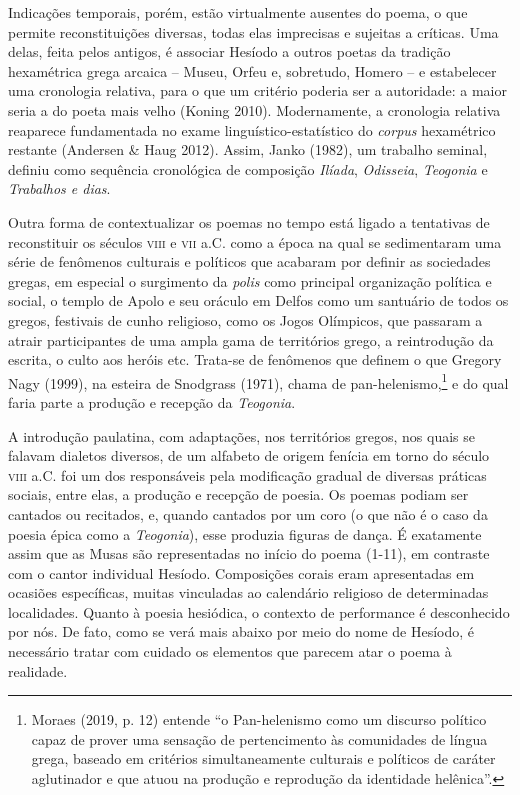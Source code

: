 Indicações temporais, porém, estão virtualmente ausentes do poema, o que
permite reconstituições diversas, todas elas imprecisas e sujeitas a
críticas. Uma delas, feita pelos antigos, é associar Hesíodo a outros
poetas da tradição hexamétrica grega arcaica -- Museu, Orfeu e,
sobretudo, Homero -- e estabelecer uma cronologia relativa, para o que
um critério poderia ser a autoridade: a maior seria a do poeta mais
velho (Koning 2010). Modernamente, a cronologia relativa reaparece
fundamentada no exame linguístico-estatístico do \emph{corpus}
hexamétrico restante (Andersen \& Haug 2012). Assim, Janko (1982), um
trabalho seminal, definiu como sequência cronológica de composição
\emph{Ilíada}, \emph{Odisseia}, \emph{Teogonia} e \emph{Trabalhos e
dias}.

Outra forma de contextualizar os poemas no tempo está ligado a
tentativas de reconstituir os séculos \textsc{viii} e \textsc{vii} a.C. 
como a época na qual se sedimentaram uma série de fenômenos culturais e 
políticos que acabaram por definir as sociedades gregas, em especial o 
surgimento da \emph{polis} como principal organização política e social, 
o templo de Apolo e seu oráculo em Delfos como um santuário de todos os gregos,
festivais de cunho religioso, como os Jogos Olímpicos, que passaram a
atrair participantes de uma ampla gama de territórios grego, a
reintrodução da escrita, o culto aos heróis etc. Trata-se de fenômenos
que definem o que Gregory Nagy (1999), na esteira de Snodgrass (1971),
chama de pan-helenismo,\footnote{Moraes (2019, p. 12) entende ``o
  Pan-helenismo como um discurso político capaz de prover uma sensação
  de pertencimento às comunidades de língua grega, baseado em critérios
  simultaneamente culturais e políticos de caráter aglutinador e que
  atuou na produção e reprodução da identidade helênica''.} e do qual
faria parte a produção e recepção da \emph{Teogonia}.

A introdução paulatina, com adaptações, nos territórios gregos, nos
quais se falavam dialetos diversos, de um alfabeto de origem fenícia em
torno do século \textsc{viii} a.C. foi um dos responsáveis pela modificação
gradual de diversas práticas sociais, entre elas, a produção e recepção
de poesia. Os poemas podiam ser cantados ou recitados, e, quando
cantados por um coro (o que não é o caso da poesia épica como a
\emph{Teogonia}), esse produzia figuras de dança. É exatamente assim que
as Musas são representadas no início do poema (1-11), em contraste com o
cantor individual Hesíodo. Composições corais eram apresentadas em
ocasiões específicas, muitas vinculadas ao calendário religioso de
determinadas localidades. Quanto à poesia hesiódica, o contexto de
performance é desconhecido por nós. De fato, como se verá mais abaixo
por meio do nome de Hesíodo, é necessário tratar com cuidado os
elementos que parecem atar o poema à realidade.

